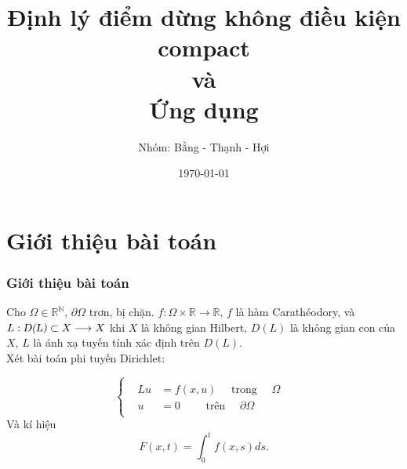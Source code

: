 \documentclass{beamer}
\title[BÁO CÁO TIỂU LUẬN TỐT NGHIÊP]{\huge Định lý điểm dừng không điều kiện compact\\ và \\ Ứng dụng}
\author{Nhóm: Bằng - Thạnh - Hợi} %
\institute[HCMUS] %
{
Thầy hướng dẫn : \textit{GS.TS DƯƠNG MINH ĐỨC.}\\ 
Thầy phản biện : \textit{ TS. ÔNG THANH HẢI}
\medskip
}
\date{\today} %
\begin{document}
\begin{frame}
\titlepage %
\end{frame}
\section{Giới thiệu bài toán}
\begin{frame}
\frametitle{Giới thiệu bài toán} %
Cho $\Omega\in\mathbb{R^{N}}$, $\partial \Omega$ trơn, bị chặn. $f:\Omega\times\mathbb{R}\longrightarrow \mathbb{R}$, $f$ là hàm Carathéodory, và $L:\textsl{D(L)}\subset X\longrightarrow X $ khi $X$ là không gian Hilbert, $D(L)$ là không gian con của $X$, $L$ là ánh xạ tuyến tính xác định trên $D(L)$.\\
Xét bài toán phi tuyến Dirichlet:

\[
\begin{cases}
\begin{array}{c}
\begin{aligned}
Lu&=f(x,u)\quad \text{ trong } \quad \Omega\\
u&=0 \qquad \text{ trên } \quad \partial\Omega
\end{aligned}
\end{array} 
\end{cases} 
\]
Và kí hiệu $$F(x,t)=\int_{0}^{t}f(x,s)ds.$$
\end{frame}


\end{document}
